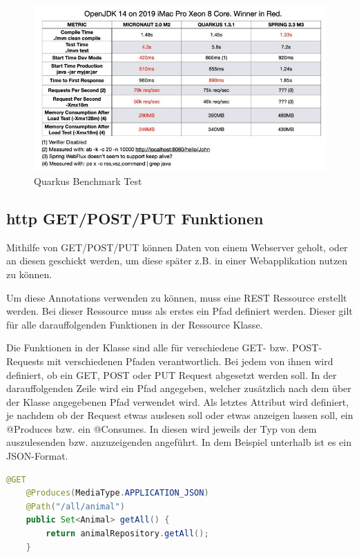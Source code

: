 \begin{figure}
    \centering
    \includegraphics[scale=0.8]{pics/quarkus_benchmark.jpg}
    \caption{Quarkus Benchmark Test \cite{MicrVSQuarVSSprin}}
    \label{fig:impl:Quarkusbenchmark}
\end{figure}
 

\subsection{http GET/POST/PUT Funktionen}
Mithilfe von GET/POST/PUT können Daten von einem Webserver geholt, oder an diesen geschickt werden, um diese später z.B. in einer Webapplikation nutzen zu können.
 
Um diese Annotations verwenden zu können, muss eine REST Ressource erstellt werden.
Bei dieser Ressource muss als erstes ein Pfad definiert werden. Dieser gilt für alle darauffolgenden Funktionen in der Ressource Klasse.
 
Die Funktionen in der Klasse sind alle für verschiedene GET- bzw. POST-Requests mit verschiedenen Pfaden verantwortlich. Bei jedem von ihnen wird definiert, ob ein GET, POST oder PUT Request abgesetzt werden soll. In der darauffolgenden Zeile wird ein Pfad angegeben, welcher zusätzlich nach dem über der Klasse angegebenen Pfad verwendet wird. Als letztes Attribut wird definiert, je nachdem ob der Request etwas auslesen soll oder etwas anzeigen lassen soll, ein @Produces bzw. ein @Consumes. In diesen wird jeweils der Typ von dem auszulesenden bzw. anzuzeigenden angeführt. In dem Beispiel unterhalb ist es ein JSON-Format. \cite{quarkusRest}
\begin{lstlisting}[language=java,caption=Quarkus POST-Request,label=lst:impl:canvasJSchartOptions]
    @GET
    @Produces(MediaType.APPLICATION_JSON)
    @Path("/all/animal")
    public Set<Animal> getAll() {
        return animalRepository.getAll();
    }
  \end{lstlisting}


